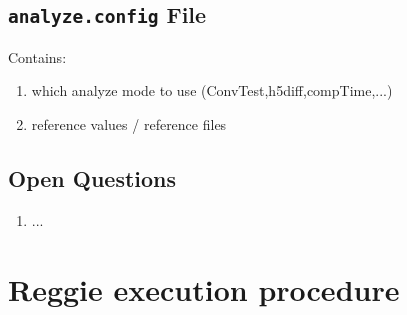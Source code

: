 \documentclass[11pt]{scrartcl}
\begin{document}
\subsection{\texttt{analyze.config} File}

Contains: 
\begin{enumerate}
 \item which analyze mode to use (ConvTest,h5diff,compTime,...)
 \item reference values / reference files 
\end{enumerate}

\subsection{Open Questions}

\begin{enumerate}
 \item ...
\end{enumerate}

\section{Reggie execution procedure}
\end{document}
